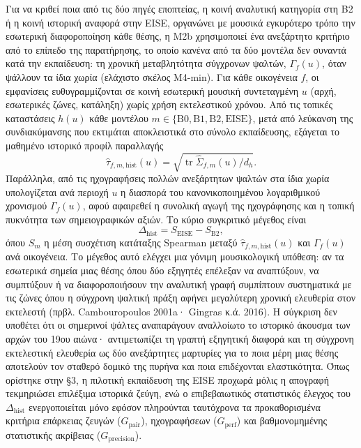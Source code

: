 \documentclass[11pt,a4paper]{article}
\begin{document}
Για να κριθεί ποια από τις δύο πηγές εποπτείας, η κοινή αναλυτική κατηγορία στη B2 ή η κοινή ιστορική αναφορά στην EISE, οργανώνει με μουσικά εγκυρότερο τρόπο την εσωτερική διαφοροποίηση κάθε θέσης, η Μ2b χρησιμοποιεί ένα ανεξάρτητο κριτήριο από το επίπεδο της παρατήρησης, το οποίο κανένα από τα δύο μοντέλα δεν συναντά κατά την εκπαίδευση: τη χρονική μεταβλητότητα σύγχρονων ψαλτών, $\Gamma_f(u)$, όταν ψάλλουν τα ίδια χωρία (ελάχιστο σκέλος Μ4-min). Για κάθε οικογένεια $f$, οι εμφανίσεις ευθυγραμμίζονται σε κοινή εσωτερική μουσική συντεταγμένη $u$ (αρχή, εσωτερικές ζώνες, κατάληξη) χωρίς χρήση εκτελεστικού χρόνου. Από τις τοπικές καταστάσεις $h(u)$ κάθε μοντέλου $m\in\{\text{B0},\text{B1},\text{B2},\text{EISE}\}$, μετά από λεύκανση της συνδιακύμανσης που εκτιμάται αποκλειστικά στο σύνολο εκπαίδευσης, εξάγεται το μαθημένο ιστορικό προφίλ παραλλαγής
\[
\hat\tau_{f,m,\text{hist}}(u)=\sqrt{\operatorname{tr}\widehat\Sigma_{f,m}(u)/d_h}.
\]
Παράλληλα, από τις ηχογραφήσεις πολλών ανεξάρτητων ψαλτών στα ίδια χωρία υπολογίζεται ανά περιοχή $u$ η διασπορά του κανονικοποιημένου λογαριθμικού χρονισμού $\Gamma_f(u)$, αφού αφαιρεθεί η συνολική αγωγή της ηχογράφησης και η τοπική πυκνότητα των σημειογραφικών αξιών. Το κύριο συγκριτικό μέγεθος είναι
\[
\Delta_{\text{hist}}=S_{\text{EISE}}-S_{\text{B2}},
\]
όπου $S_m$ η μέση συσχέτιση κατάταξης Spearman μεταξύ $\hat\tau_{f,m,\text{hist}}(u)$ και $\Gamma_f(u)$ ανά οικογένεια. Το μέγεθος αυτό ελέγχει μια γόνιμη μουσικολογική υπόθεση: αν τα εσωτερικά σημεία μιας θέσης όπου δύο εξηγητές επέλεξαν να αναπτύξουν, να συμπτύξουν ή να διαφοροποιήσουν την αναλυτική γραφή συμπίπτουν συστηματικά με τις ζώνες όπου η σύγχρονη ψαλτική πράξη αφήνει μεγαλύτερη χρονική ελευθερία στον εκτελεστή (πρβλ. Cambouropoulos 2001a· Gingras κ.ά. 2016). Η σύγκριση δεν υποθέτει ότι οι σημερινοί ψάλτες αναπαράγουν αναλλοίωτο το ιστορικό άκουσμα των αρχών του 19ου αιώνα· αντιμετωπίζει τη γραπτή εξηγητική διαφορά και τη σύγχρονη εκτελεστική ελευθερία ως δύο ανεξάρτητες μαρτυρίες για το ποια μέρη μιας θέσης αποτελούν τον σταθερό δομικό της πυρήνα και ποια επιδέχονται ελαστικότητα. Όπως ορίστηκε στην §3, η πιλοτική εκπαίδευση της EISE προχωρά μόλις η απογραφή τεκμηριώσει επιλέξιμα ιστορικά ζεύγη, ενώ ο επιβεβαιωτικός στατιστικός έλεγχος του $\Delta_{\text{hist}}$ ενεργοποιείται μόνο εφόσον πληρούνται ταυτόχρονα τα προκαθορισμένα κριτήρια επάρκειας ζευγών ($G_{\text{pair}}$), ηχογραφήσεων ($G_{\text{perf}}$) και βαθμονομημένης στατιστικής ακρίβειας ($G_{\text{precision}}$).

\end{document}
